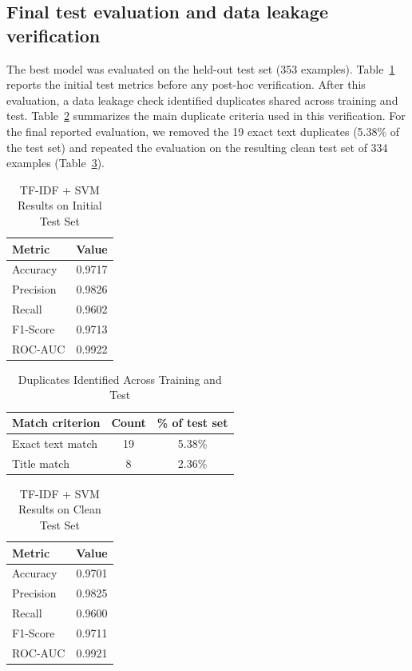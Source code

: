 \documentclass[conference]{IEEEtran}
\begin{document}
\subsection{Final test evaluation and data leakage verification}

The best model was evaluated on the held-out test set (353 examples). Table~\ref{tab:testresults_initial} reports the initial test metrics before any post-hoc verification. After this evaluation, a data leakage check identified duplicates shared across training and test. Table~\ref{tab:leakage_duplicates} summarizes the main duplicate criteria used in this verification. For the final reported evaluation, we removed the 19 exact text duplicates (5.38\% of the test set) and repeated the evaluation on the resulting clean test set of 334 examples (Table~\ref{tab:testresults}).

\begin{table}[h]
\caption{TF-IDF + SVM Results on Initial Test Set}
\label{tab:testresults_initial}
\centering
\begin{tabular}{lc}
\toprule
Metric & Value \\
\midrule
Accuracy & 0.9717 \\
Precision & 0.9826 \\
Recall & 0.9602 \\
F1-Score & 0.9713 \\
ROC-AUC & 0.9922 \\
\bottomrule
\end{tabular}
\end{table}

\begin{table}[h]
\caption{Duplicates Identified Across Training and Test}
\label{tab:leakage_duplicates}
\centering
\begin{tabular}{lcc}
\toprule
Match criterion & Count & \% of test set \\
\midrule
Exact text match & 19 & 5.38\% \\
Title match & 8 & 2.36\% \\
\bottomrule
\end{tabular}
\end{table}

\begin{table}[h]
\caption{TF-IDF + SVM Results on Clean Test Set}
\label{tab:testresults}
\centering
\begin{tabular}{lc}
\toprule
Metric & Value \\
\midrule
Accuracy & 0.9701 \\
Precision & 0.9825 \\
Recall & 0.9600 \\
F1-Score & 0.9711 \\
ROC-AUC & 0.9921 \\
\bottomrule
\end{tabular}
\end{table}
\end{document}
